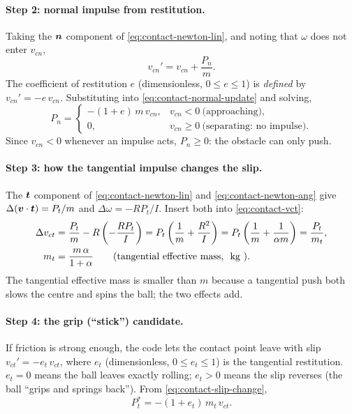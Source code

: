 \paragraph{Step 2: normal impulse from restitution.}
Taking the $\bm{n}$ component of \eqref{eq:contact-newton-lin}, and noting that $\omega$ does not
enter $v_{cn}$,
\begin{equation}
  v_{cn}' = v_{cn} + \frac{P_n}{m}.
  \label{eq:contact-normal-update}
\end{equation}
The coefficient of restitution $e$ (dimensionless, $0\le e\le1$) is \emph{defined} by
$v_{cn}'=-e\,v_{cn}$. Substituting into \eqref{eq:contact-normal-update} and solving,
\begin{equation}
  P_n =
  \begin{cases}
    -(1+e)\,m\,v_{cn}, & v_{cn}<0 \ \text{(approaching)},\\
    0, & v_{cn}\ge 0 \ \text{(separating: no impulse)}.
  \end{cases}
  \label{eq:contact-Pn}
\end{equation}
Since $v_{cn}<0$ whenever an impulse acts, $P_n\ge0$: the obstacle can only push.

\paragraph{Step 3: how the tangential impulse changes the slip.}
The $\bm{t}$ component of \eqref{eq:contact-newton-lin} and \eqref{eq:contact-newton-ang} give
$\Delta(\bm{v}\cdot\bm{t}) = P_t/m$ and $\Delta\omega=-RP_t/I$. Insert both into
\eqref{eq:contact-vct}:
\begin{align}
  \Delta v_{ct} &= \frac{P_t}{m} - R\left(-\frac{R P_t}{I}\right)
  = P_t\left(\frac{1}{m}+\frac{R^2}{I}\right)
  = P_t\left(\frac{1}{m}+\frac{1}{\alpha m}\right)
  = \frac{P_t}{m_t},
  \label{eq:contact-slip-change}\\
  m_t &= \frac{m\,\alpha}{1+\alpha}
  \qquad\text{(tangential effective mass, \unit{kg}).}
  \label{eq:contact-mt}
\end{align}
The tangential effective mass is smaller than $m$ because a tangential push both slows the
centre and spins the ball; the two effects add.

\paragraph{Step 4: the grip (``stick'') candidate.}
If friction is strong enough, the code lets the contact point leave with slip
$v_{ct}' = -e_t\,v_{ct}$, where $e_t$ (dimensionless, $0\le e_t\le 1$) is the tangential
restitution. $e_t=0$ means the ball leaves exactly rolling; $e_t>0$ means the slip reverses
(the ball ``grips and springs back''). From \eqref{eq:contact-slip-change},
\begin{equation}
  P_t^{*} = -(1+e_t)\,m_t\,v_{ct}.
  \label{eq:contact-Pstar}
\end{equation}

